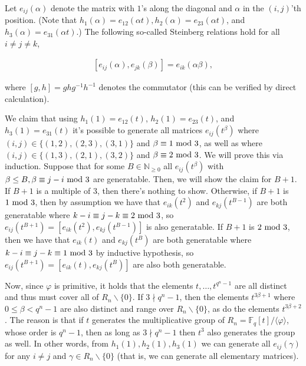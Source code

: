 \documentclass[10pt,a4paper]{article}
\begin{document}
Let $e_{ij}(\alpha)$ denote the matrix with $1$’s along the diagonal and $\alpha$ in the $(i,j)$’th position. (Note that $h_{1}(\alpha)=e_{12}(\alpha t),h_{2}(\alpha)=e_{23}(\alpha t)$, and $h_{3}(\alpha)=e_{31}(\alpha t)$.) The following so-called Steinberg relations hold for all $i\not=j\not=k$,\par


\[\begin{gathered}
[e_{ij}(\alpha),e_{jk}(\beta)]=e_{ik}(\alpha\beta),
\end{gathered}\]


where $[g,h]=ghg^{-1}h^{-1}$ denotes the commutator (this can be verified by direct calculation).\par




We claim that using $h_{1}(1)=e_{12}(t)$, $h_{2}(1)=e_{23}(t)$, and $h_{3}(1)=e_{31}(t)$ it’s possible to generate all matrices $e_{ij}(t^{\beta})$ where $(i,j)\in\{(1,2),(2,3),(3,1)\}$ and $\beta\equiv 1\nobreak\ \text{mod}\nobreak\ 3$, as well as where $(i,j)\in\{(1,3),(2,1),(3,2)\}$ and $\beta\equiv 2\nobreak\ \text{mod}\nobreak\ 3$. We will prove this via induction. Suppose that for some $B\in\mathbb{N}_{\geq 0}$ all $e_{ij}(t^{\beta})$ with $\beta\leq B,\beta\equiv j-i\nobreak\ \text{mod}\nobreak\ 3$ are generatable. Then, we will show the claim for $B+1$. If $B+1$ is a multiple of $3$, then there’s nothing to show. Otherwise, if $B+1$ is $1\nobreak\ \text{mod}\nobreak\ 3$, then by assumption we have that $e_{ik}(t^{2})$ and $e_{kj}(t^{B-1})$ are both generatable where $k-i\equiv j-k\equiv 2\nobreak\ \text{mod}\nobreak\ 3$, so $e_{ij}(t^{B+1})=[e_{ik}(t^{2}),e_{kj}(t^{B-1})]$ is also generatable. If $B+1$ is $2\nobreak\ \text{mod}\nobreak\ 3$, then we have that $e_{ik}(t)$ and $e_{kj}(t^{B})$ are both generatable where $k-i\equiv j-k\equiv 1\nobreak\ \text{mod}\nobreak\ 3$ by inductive hypothesis, so $e_{ij}(t^{B+1})=[e_{ik}(t),e_{kj}(t^{B})]$ are also both generatable.\par




Now, since $\varphi$ is primitive, it holds that the elements $t,\dots,t^{q^{n}-1}$ are all distinct and thus must cover all of $R_{n}\backslash\{0\}$. If $3\nmid q^{n}-1$, then the elements $t^{3\beta+1}$ where $0\leq\beta<q^{n}-1$ are also distinct and range over $R_{n}\backslash\{0\}$, as do the elements $t^{3\beta+2}$.
The reason is that if $t$ generates the multiplicative group of $R_{n}=\mathbb{F}_{q}[t]/\langle\varphi\rangle$, whose order is $q^{n}-1$, then as long as $3\nmid q^{n}-1$ then $t^{3}$ also generates the group as well.
In other words, from $h_{1}(1),h_{2}(1),h_{3}(1)$ we can generate all $e_{ij}(\gamma)$ for any $i\not=j$ and $\gamma\in R_{n}\backslash\{0\}$ (that is, we can generate all elementary matrices).\par
\end{document}
